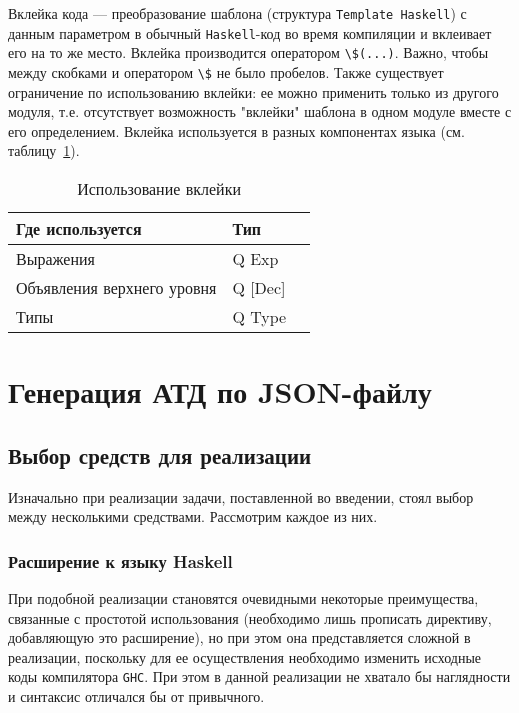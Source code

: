 Вклейка кода --- преобразование шаблона (структура \lstinline{Template Haskell}) с данным параметром в обычный \lstinline{Haskell}-код во время компиляции и вклеивает его на то же место. Вклейка производится оператором  \lstinline{\$(...)}. Важно, чтобы между скобками и оператором \lstinline{\$} не было пробелов. Также существует ограничение по использованию вклейки: ее можно применить только из другого модуля, т.е. отсутствует возможность "вклейки" шаблона в одном модуле вместе с его определением. Вклейка используется в разных компонентах языка (см. таблицу~\ref{tab:splicing}).

\begin{table}
\centering
\caption{\label{tab:splicing}Использование вклейки}
\begin{tabular}{llr}
\toprule
\cmidrule(r){1-2}
Где используется  & Тип    \\
\midrule
Выражения          & Q Exp           \\
Объявления верхнего уровня      & Q [Dec]          \\
Типы       & Q Type          \\
\bottomrule
\end{tabular}
\end{table}

\chapter{Генерация АТД по JSON-файлу}

\section{Выбор средств для реализации}

Изначально при реализации задачи, поставленной во введении, стоял выбор между несколькими средствами. Рассмотрим каждое из них.

\subsection{Расширение к языку Haskell}
При подобной реализации становятся очевидными некоторые преимущества, связанные с простотой использования (необходимо лишь прописать директиву, добавляющую это расширение), но при этом она представляется сложной в реализации, поскольку для ее осуществления необходимо изменить исходные коды компилятора  \lstinline{GHC}. При этом в данной реализации не хватало бы наглядности и синтаксис отличался бы от привычного.


